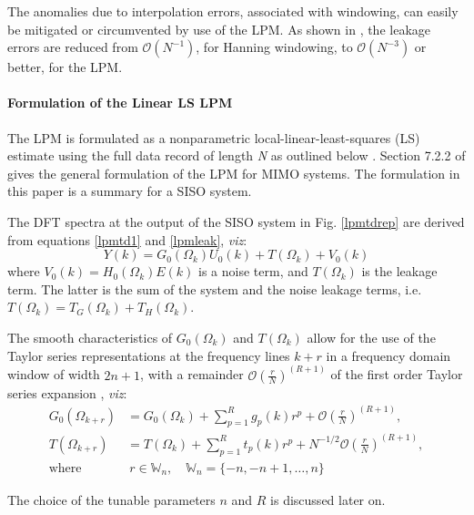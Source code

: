 The anomalies due to interpolation errors, associated with windowing, can easily be mitigated or circumvented by use of the LPM. As shown in \cite{FDidentEd2Pintelon}, the leakage errors are reduced from  $\mathcal{O}({N}^{-1})$, for Hanning windowing, to $\mathcal{O}({N}^{-3})$ or better, for the LPM.


\paragraph{Formulation of the Linear LS LPM}
The LPM is formulated as a nonparametric local-linear-least-squares (LS) estimate using the full data record of length \emph{N} as outlined below \cite{schoukens2010nonparametric}. Section 7.2.2 of \cite{FDidentEd2Pintelon} 
gives the general formulation of the LPM for MIMO systems. The formulation in this paper is a summary for a SISO system.

The DFT spectra at the output of the SISO system in Fig. \ref{lpmtdrep} are derived from equations \eqref{lpmtd1} and \eqref{lpmleak}, \emph{viz}:
\begin{equation}\label{lpm1spectra}
Y(k)=G_0(\Omega_k)U_0(k)+T(\Omega_k)+V_0(k)
\end{equation}
where $V_0(k) = H_0(\Omega_k)E(k)$ is a noise term, and $T(\Omega_k)$ is the leakage term. The latter is the sum of the system and the noise leakage terms, i.e. $T(\Omega_k) = T_G(\Omega_k) + T_H(\Omega_k)$.

The smooth characteristics of $G_0(\Omega_k)$ and $T(\Omega_k)$ allow for the use of the Taylor series representations at the frequency lines $k+r$ in a frequency domain window of width $2n+1$, with a remainder $\mathcal{O}\left(\frac{r}{N}\right)^{(R+1)}$ of the first order Taylor series expansion \cite{schoukens2010nonparametric}, \emph{viz}:
\begin{align}\label{lpmGTaylorS}
G_0(\Omega_{k+r})&=G_0(\Omega_k)+\sum_{p=1}^{R}g_p(k)r^p+\mathcal{O}\left(\frac{r}{N}\right)^{(R+1)},
\\
\label{lpmTTaylorS}
T(\Omega_{k+r})&=T(\Omega_k)+\sum_{p=1}^{R}t_p(k)r^p+N^{-1/2}\mathcal{O}\left(\frac{r}{N}\right)^{(R+1)},
\\
\text{where}&\ r\in\mathbb{W}_n,\quad \mathbb{W}_n = \{-n,-n+1,\dots,n\}
\end{align}



The choice of the tunable parameters $n$ and $R$ is discussed later on.




